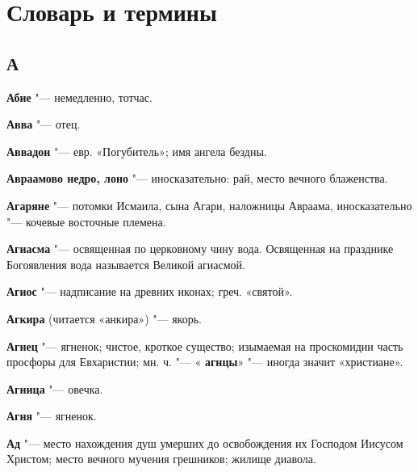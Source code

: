 \SetupCutAtSection

\chapter{Словарь и термины}
 
\begin{mymulticols}{2}\footnotesize

\section{А}


\noindent\textbf{Абие} "--- немедленно, тотчас. 




\noindent\textbf{Авва} "--- отец. 




\noindent\textbf{Аввадон} "--- евр. «Погубитель»; имя ангела бездны. 




\noindent\textbf{Авраамово недро, лоно} "--- иносказательно: рай, место вечного блаженства. 




\noindent\textbf{Агаряне} "--- потомки Исмаила, сына Агари, наложницы Авраама, иносказательно "--- кочевые восточные племена. 




\noindent\textbf{Агиасма} "--- освященная по церковному чину вода. Освященная на празднике Богоявления вода называется Великой агиасмой. 




\noindent\textbf{Агиос} "--- надписание на древних иконах; греч. «святой». 




\noindent\textbf{Агкира} (читается «анкира») "--- якорь. 




\noindent\textbf{Агнец} "--- ягненок; чистое, кроткое существо; изымаемая на проскомидии часть просфоры для Евхаристии; мн. ч. "--- « \noindent\textbf{агнцы}» "--- иногда значит «христиане». 




\noindent\textbf{Агница} "--- овечка. 




\noindent\textbf{Агня} "--- ягненок. 




\noindent\textbf{Ад} "--- место нахождения душ умерших до освобождения их Господом Иисусом Христом; место вечного мучения грешников; жилище диавола. 





\end{mymulticols}
